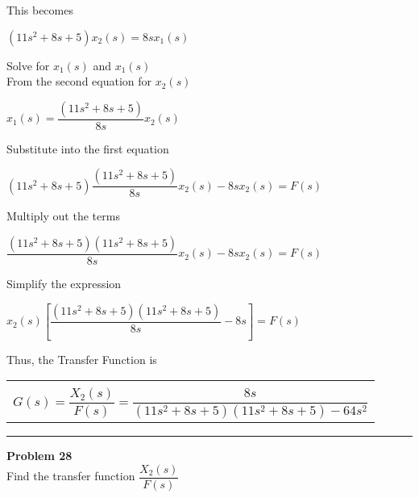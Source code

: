 \documentclass[11pt,letterpaper]{article}
\begin{document}
This becomes\\
\begin{center}
	$(11s^2+8s+5)x_2(s)=8sx_1(s)$\\
\end{center}
Solve for $x_1(s)$ and $x_1(s)$\\[12pt]
From the second equation for $x_2(s)$\\
\begin{center}
	$x_1(s)=\dfrac{(11s^2+8s+5)}{8s}x_2(s)$\\
\end{center}
Substitute into the first equation\\
\begin{center}
	$(11s^2+8s+5)\dfrac{(11s^2+8s+5)}{8s}x_2(s)-8sx_2(s)=F(s)$\\
\end{center}
Multiply out the terms\\
\begin{center}
	$\dfrac{(11s^2+8s+5)(11s^2+8s+5)}{8s}x_2(s)-8sx_2(s)=F(s)$\\
\end{center}
Simplify the expression\\
\begin{center}
	$x_2(s)\left[\dfrac{(11s^2+8s+5)(11s^2+8s+5)}{8s}-8s\right]=F(s) $\\
\end{center}
Thus, the Transfer Function is\\
\begin{center}
	\begin{tabular}{|c|}
		\hline \\
		$G(s)=\dfrac{X_2(s)}{F(s)}=\dfrac{8s}{(11s^2+8s+5)(11s^2+8s+5)-64s^2}$	\\ [12pt]
	\hline
	\end{tabular}	
\end{center}

\clearpage

\rule{\textwidth}{1pt}
\textbf{Problem 28}\\
Find the transfer function $\dfrac{X_2(s)}{F(s)}$\\
\end{document}
